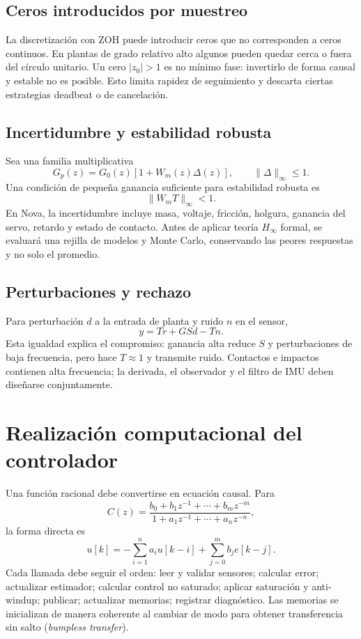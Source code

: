 \documentclass[11pt,letterpaper]{article}
\begin{document}
\subsection{Ceros introducidos por muestreo}
La discretización con ZOH puede introducir ceros que no corresponden a ceros
continuos. En plantas de grado relativo alto algunos pueden quedar cerca o
fuera del círculo unitario. Un cero $|z_0|>1$ es no mínimo fase: invertirlo de
forma causal y estable no es posible. Esto limita rapidez de seguimiento y
descarta ciertas estrategias deadbeat o de cancelación.

\subsection{Incertidumbre y estabilidad robusta}
Sea una familia multiplicativa
\begin{equation}
 G_p(z)=G_0(z)[1+W_m(z)\Delta(z)],\qquad
 \|\Delta\|_\infty\le1.
\end{equation}
Una condición de pequeña ganancia suficiente para estabilidad robusta es
\begin{equation}
 \|W_m T\|_\infty<1.
\end{equation}
En Nova, la incertidumbre incluye masa, voltaje, fricción, holgura, ganancia del
servo, retardo y estado de contacto. Antes de aplicar teoría $H_\infty$ formal,
se evaluará una rejilla de modelos y Monte Carlo, conservando las peores
respuestas y no solo el promedio.

\subsection{Perturbaciones y rechazo}
Para perturbación $d$ a la entrada de planta y ruido $n$ en el sensor,
\begin{equation}
 y=T r+G S d-T n.
\end{equation}
Esta igualdad explica el compromiso: ganancia alta reduce $S$ y perturbaciones
de baja frecuencia, pero hace $T\approx1$ y transmite ruido. Contactos e
impactos contienen alta frecuencia; la derivada, el observador y el filtro de
IMU deben diseñarse conjuntamente.

\section{Realización computacional del controlador}
Una función racional debe convertirse en ecuación causal. Para
\begin{equation}
 C(z)=\frac{b_0+b_1z^{-1}+\cdots+b_mz^{-m}}
 {1+a_1z^{-1}+\cdots+a_nz^{-n}},
\end{equation}
la forma directa es
\begin{equation}
 u[k]=-\sum_{i=1}^{n}a_i u[k-i]+
 \sum_{j=0}^{m}b_j e[k-j].
\end{equation}
Cada llamada debe seguir el orden: leer y validar sensores; calcular error;
actualizar estimador; calcular control no saturado; aplicar saturación y
anti-windup; publicar; actualizar memorias; registrar diagnóstico. Las memorias
se inicializan de manera coherente al cambiar de modo para obtener transferencia
sin salto (\emph{bumpless transfer}).
\end{document}
